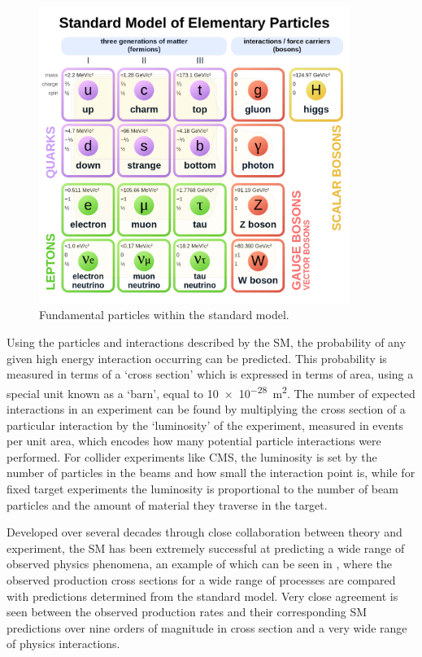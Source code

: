 \begin{figure}[htpb]
	\includegraphics[width=0.9\textwidth]{figures/smParticles.pdf}
	\centering
	\caption{Fundamental particles within the standard model.}
	\label{fig:SM}
\end{figure}

Using the particles and interactions described by the SM, the probability of any given high energy interaction occurring can be predicted.
This probability is measured in terms of a `cross section' which is expressed in terms of area, using a special unit known as a `barn', equal to \SI{10e-28}{\meter\squared}.
The number of expected interactions in an experiment can be found by multiplying the cross section of a particular interaction by the `luminosity' of the experiment, measured in events per unit area, which encodes how many potential particle interactions were performed.
For collider experiments like CMS, the luminosity is set by the number of particles in the beams and how small the interaction point is, while for fixed target experiments the luminosity is proportional to the number of beam particles and the amount of material they traverse in the target.

Developed over several decades through close collaboration between theory and experiment, the SM has been extremely successful at predicting a wide range of observed physics phenomena, an example of which can be seen in , where the observed production cross sections for a wide range of processes are compared with predictions determined from the standard model.
Very close agreement is seen between the observed production rates and their corresponding SM predictions over nine orders of magnitude in cross section and a very wide range of physics interactions.

